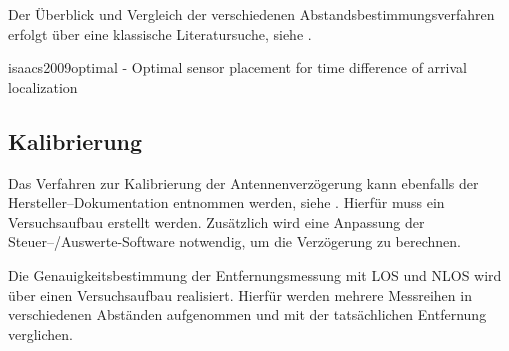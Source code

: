 Der Überblick und Vergleich der verschiedenen Abstandsbestimmungsverfahren erfolgt über eine klassische Literatursuche, siehe \cite{lee2007comparative, herranz2010studying, zekavat2011handbook}.


isaacs2009optimal - Optimal sensor placement for time difference of arrival localization


\begin{comment}
------------------------------------------------------------------------------------------
\end{comment}
\subsection{Kalibrierung}

\begin{comment}
- Kalibierungsalgorithmus nach decaWave
	- Hab ich den Überhaupt richtig implementiert?
- Kalibierung über die Anpassung der einer Antennen Delay für alle.
- Kann über die Kalibrierung der Antennenverzögerung eine genauere Entfernungsmessung erreicht werden?
\end{comment}


Das Verfahren zur Kalibrierung der Antennenverzögerung kann ebenfalls der Hersteller--Dokumentation entnommen werden, siehe \cite{decawave2014calibration}. Hierfür muss ein Versuchsaufbau erstellt werden. Zusätzlich wird eine Anpassung der Steuer--/Auswerte-Software notwendig, um die Verzögerung zu berechnen.

Die Genauigkeitsbestimmung der Entfernungsmessung mit LOS und NLOS wird über einen Versuchsaufbau realisiert. Hierfür werden mehrere Messreihen in verschiedenen Abständen aufgenommen und mit der tatsächlichen Entfernung verglichen.